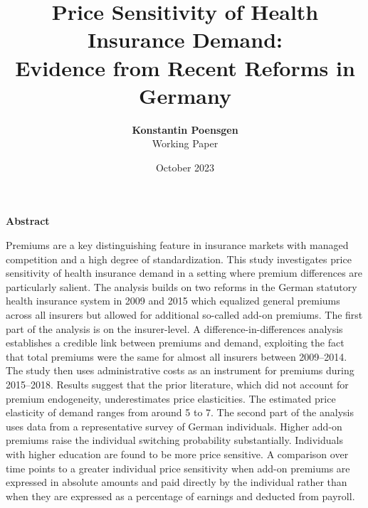 \documentclass[a4paper, 11pt, english]{article}
\begin{document}
	
	\vspace{2em}

	\title{Price Sensitivity of Health Insurance Demand: \\ \vspace{-10pt} Evidence from Recent Reforms in Germany}
	\author{\textbf{Konstantin Poensgen} \\ Working Paper}
	\date{October 2023}
	\maketitle
	\thispagestyle{empty}

\vspace{2em}

\begin{center}
	\textbf{Abstract}
\end{center}

\begin{addmargin}[1.5em]{1.5em}
	\noindent Premiums are a key distinguishing feature in insurance markets with managed competition and a high degree of standardization. This study investigates price sensitivity of health insurance demand in a setting where premium differences are particularly salient. The analysis builds on two reforms in the German statutory health insurance system in 2009 and 2015 which equalized general premiums across all insurers but allowed for additional so-called add-on premiums.
	The first part of the analysis is on the insurer-level. A difference-in-differences analysis establishes a credible link between premiums and demand, exploiting the fact that total premiums were the same for almost all insurers between 2009--2014. The study then uses administrative costs as an instrument for premiums during 2015--2018. Results suggest that the prior literature, which did not account for premium endogeneity, underestimates price elasticities. The estimated price elasticity of demand ranges from around 5 to 7. 
	The second part of the analysis uses data from a representative survey of German individuals. Higher add-on premiums raise the individual switching probability substantially. Individuals with higher education are found to be more price sensitive. 
	A comparison over time points to a greater individual price sensitivity when add-on premiums are expressed in absolute amounts and paid directly by the individual rather than when they are expressed as a percentage of earnings and deducted from payroll.
\end{addmargin}
\end{document}

